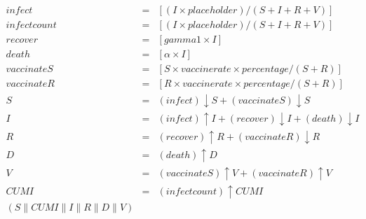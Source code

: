 \begin{eqnarray*}
\mathit{infect} & = & [(I\times \mathit{placeholder})/(S+I+R+V)]\\%
\mathit{infectcount} & = & [(I\times \mathit{placeholder})/(S+I+R+V)]\\%
\mathit{recover} & = & [\mathit{gamma1}\times I]\\%
\mathit{death} & = & [\alpha\times I]\\%
\mathit{vaccinateS} & = & [S\times \mathit{vaccinerate}\times \mathit{percentage}/(S+R)]\\%
\mathit{vaccinateR} & = & [R\times \mathit{vaccinerate}\times \mathit{percentage}/(S+R)]\\%
%
S & = & (\mathit{infect}){\downarrow}S + (\mathit{vaccinateS}){\downarrow}S\\%
I & = & (\mathit{infect}){\uparrow}I + (\mathit{recover}){\downarrow}I + (\mathit{death}){\downarrow}I\\%
R & = & (\mathit{recover}){\uparrow}R + (\mathit{vaccinateR}){\downarrow}R\\%
D & = & (\mathit{death}){\uparrow}D\\%
V & = & (\mathit{vaccinateS}){\uparrow}V + (\mathit{vaccinateR}){\uparrow}V\\%
%
\mathit{CUMI} & = & (\mathit{infectcount}){\uparrow}\mathit{CUMI}\\%
%
(S {\parallel} \mathit{CUMI} {\parallel} I {\parallel} R {\parallel} D {\parallel} V)\end{eqnarray*}
